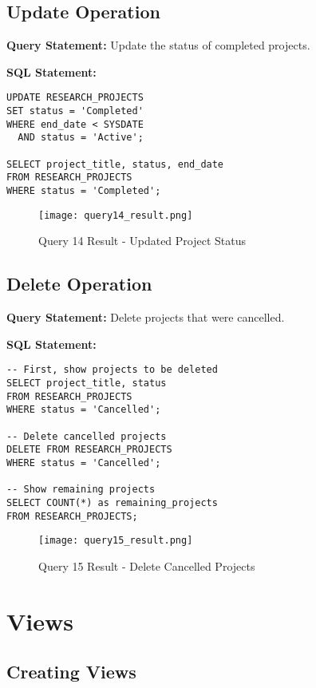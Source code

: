 \documentclass[12pt,a4paper]{article}
\begin{document}
\subsection{Update Operation}
\textbf{Query Statement:} Update the status of completed projects.

\textbf{SQL Statement:}
\begin{lstlisting}[style=sqlstyle]
UPDATE RESEARCH_PROJECTS
SET status = 'Completed'
WHERE end_date < SYSDATE
  AND status = 'Active';

SELECT project_title, status, end_date
FROM RESEARCH_PROJECTS
WHERE status = 'Completed';
\end{lstlisting}

\begin{figure}[H]
    \centering
    \texttt{[image: query14\_result.png]}
    \caption{Query 14 Result - Updated Project Status}
\end{figure}

\subsection{Delete Operation}
\textbf{Query Statement:} Delete projects that were cancelled.

\textbf{SQL Statement:}
\begin{lstlisting}[style=sqlstyle]
-- First, show projects to be deleted
SELECT project_title, status
FROM RESEARCH_PROJECTS
WHERE status = 'Cancelled';

-- Delete cancelled projects
DELETE FROM RESEARCH_PROJECTS
WHERE status = 'Cancelled';

-- Show remaining projects
SELECT COUNT(*) as remaining_projects
FROM RESEARCH_PROJECTS;
\end{lstlisting}

\begin{figure}[H]
    \centering
    \texttt{[image: query15\_result.png]}
    \caption{Query 15 Result - Delete Cancelled Projects}
\end{figure}

\section{Views}

\subsection{Creating Views}
\end{document}
